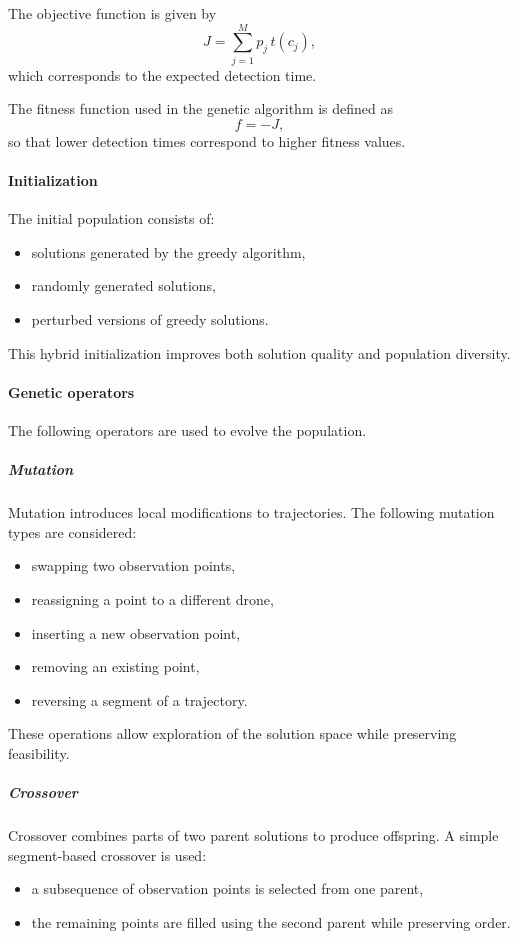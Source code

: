 \documentclass[english]{projectreport}
\begin{document}
The objective function is given by
\[
J = \sum_{j=1}^{M} p_j \, t(c_j),
\]
which corresponds to the expected detection time.

The fitness function used in the genetic algorithm is defined as
\[
f = -J,
\]
so that lower detection times correspond to higher fitness values.

\paragraph{Initialization}

The initial population consists of:
\begin{itemize}
    \item solutions generated by the greedy algorithm,
    \item randomly generated solutions,
    \item perturbed versions of greedy solutions.
\end{itemize}

This hybrid initialization improves both solution quality and population diversity.

\paragraph{Genetic operators}

The following operators are used to evolve the population.

\subparagraph{Mutation}

Mutation introduces local modifications to trajectories. The following mutation types are considered:
\begin{itemize}
    \item swapping two observation points,
    \item reassigning a point to a different drone,
    \item inserting a new observation point,
    \item removing an existing point,
    \item reversing a segment of a trajectory.
\end{itemize}

These operations allow exploration of the solution space while preserving feasibility.

\subparagraph{Crossover}

Crossover combines parts of two parent solutions to produce offspring. A simple segment-based crossover is used:
\begin{itemize}
    \item a subsequence of observation points is selected from one parent,
    \item the remaining points are filled using the second parent while preserving order.
\end{itemize}
\end{document}
